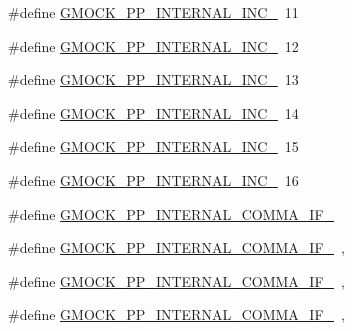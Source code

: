 \begin{DoxyCompactItemize}
\#define \mbox{\hyperlink{googletest-master_2googlemock_2include_2gmock_2internal_2gmock-pp_8h_aa3810860ab9ebd07601acdbedb612824}{G\+M\+O\+C\+K\+\_\+\+P\+P\+\_\+\+I\+N\+T\+E\+R\+N\+A\+L\+\_\+\+I\+N\+C\+\_}}~11
\item 
\#define \mbox{\hyperlink{googletest-master_2googlemock_2include_2gmock_2internal_2gmock-pp_8h_a59e17461e0baa9b154625f7861af34b4}{G\+M\+O\+C\+K\+\_\+\+P\+P\+\_\+\+I\+N\+T\+E\+R\+N\+A\+L\+\_\+\+I\+N\+C\+\_}}~12
\item 
\#define \mbox{\hyperlink{googletest-master_2googlemock_2include_2gmock_2internal_2gmock-pp_8h_a4ac354e1e915139aa339364418a5c189}{G\+M\+O\+C\+K\+\_\+\+P\+P\+\_\+\+I\+N\+T\+E\+R\+N\+A\+L\+\_\+\+I\+N\+C\+\_}}~13
\item 
\#define \mbox{\hyperlink{googletest-master_2googlemock_2include_2gmock_2internal_2gmock-pp_8h_a3ddc4589e38ae717aa4766aba2bf0bbf}{G\+M\+O\+C\+K\+\_\+\+P\+P\+\_\+\+I\+N\+T\+E\+R\+N\+A\+L\+\_\+\+I\+N\+C\+\_}}~14
\item 
\#define \mbox{\hyperlink{googletest-master_2googlemock_2include_2gmock_2internal_2gmock-pp_8h_a2df1f864eb3b389b50791639f32b7142}{G\+M\+O\+C\+K\+\_\+\+P\+P\+\_\+\+I\+N\+T\+E\+R\+N\+A\+L\+\_\+\+I\+N\+C\+\_}}~15
\item 
\#define \mbox{\hyperlink{googletest-master_2googlemock_2include_2gmock_2internal_2gmock-pp_8h_a98718a29ed1a47d49f25974ba01deda2}{G\+M\+O\+C\+K\+\_\+\+P\+P\+\_\+\+I\+N\+T\+E\+R\+N\+A\+L\+\_\+\+I\+N\+C\+\_}}~16
\item 
\#define \mbox{\hyperlink{googletest-master_2googlemock_2include_2gmock_2internal_2gmock-pp_8h_a214534d4a95f56765555dd6a634b3ec0}{G\+M\+O\+C\+K\+\_\+\+P\+P\+\_\+\+I\+N\+T\+E\+R\+N\+A\+L\+\_\+\+C\+O\+M\+M\+A\+\_\+\+I\+F\+\_}}
\item 
\#define \mbox{\hyperlink{googletest-master_2googlemock_2include_2gmock_2internal_2gmock-pp_8h_a7e24c589c5166c7db18207ea856b757e}{G\+M\+O\+C\+K\+\_\+\+P\+P\+\_\+\+I\+N\+T\+E\+R\+N\+A\+L\+\_\+\+C\+O\+M\+M\+A\+\_\+\+I\+F\+\_}}~,
\item 
\#define \mbox{\hyperlink{googletest-master_2googlemock_2include_2gmock_2internal_2gmock-pp_8h_ace0591e876b40a1954cc1e9a72c5413b}{G\+M\+O\+C\+K\+\_\+\+P\+P\+\_\+\+I\+N\+T\+E\+R\+N\+A\+L\+\_\+\+C\+O\+M\+M\+A\+\_\+\+I\+F\+\_}}~,
\item 
\#define \mbox{\hyperlink{googletest-master_2googlemock_2include_2gmock_2internal_2gmock-pp_8h_a2d5a1a8b63194783114ec21a0a81f11a}{G\+M\+O\+C\+K\+\_\+\+P\+P\+\_\+\+I\+N\+T\+E\+R\+N\+A\+L\+\_\+\+C\+O\+M\+M\+A\+\_\+\+I\+F\+\_}}~,

\end{DoxyCompactItemize}
